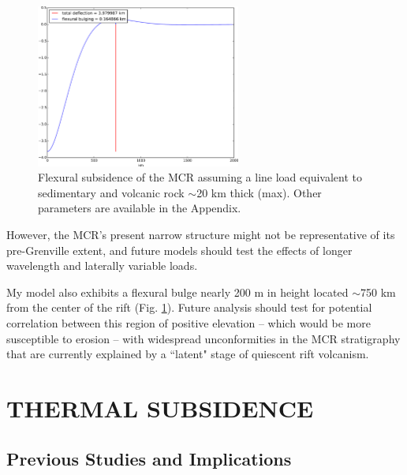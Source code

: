 \documentclass[12pt,letterpaper]{article}
\begin{document}
\begin{figure}
\vspace{-10pt}
\noindent\includegraphics[width=0.6\textwidth]{figures/flex_fig.pdf}
\vspace{-20pt}
\caption{\footnotesize{Flexural subsidence of the MCR assuming a line load equivalent to sedimentary and volcanic rock $\sim$20 km thick (max). Other parameters are available in the Appendix.}}
\label{fig:flex_sub}
\vspace{-40pt}
\end{figure}

However, the MCR's present narrow structure might not be representative of its pre-Grenville extent, and future models should test the effects of longer wavelength and laterally variable loads.\par

My model also exhibits a flexural bulge nearly 200 m in height located $\sim$750 km from the center of the rift (Fig. \ref{fig:flex_sub}). Future analysis should test for potential correlation between this region of positive elevation -- which would be more susceptible to erosion -- with widespread unconformities in the MCR stratigraphy that are currently explained by a ``latent" stage of quiescent rift volcanism.\par

\section{THERMAL SUBSIDENCE}
\subsection{Previous Studies and Implications}
 
\end{document}
